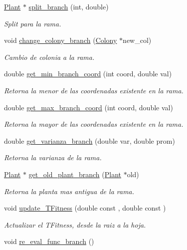 \begin{DoxyCompactItemize}
\item 
\hyperlink{class_plant}{Plant} $\ast$ \hyperlink{class_plant_ab7c3c50790efd2843219e439cdf7e687}{split\+\_\+branch} (int, double)
\begin{DoxyCompactList}\small\item\em Split para la rama. \end{DoxyCompactList}\item 
void \hyperlink{class_plant_a3da8873875164b9924111020fb3a374e}{change\+\_\+colony\+\_\+branch} (\hyperlink{class_colony}{Colony} $\ast$new\+\_\+col)
\begin{DoxyCompactList}\small\item\em Cambio de colonia a la rama. \end{DoxyCompactList}\item 
double \hyperlink{class_plant_a19634cf97e315f3245130ef23ce1a670}{get\+\_\+min\+\_\+branch\+\_\+coord} (int coord, double val)
\begin{DoxyCompactList}\small\item\em Retorna la menor de las coordenadas existente en la rama. \end{DoxyCompactList}\item 
double \hyperlink{class_plant_ab827c5ca9da0923a949232e0c81bb0fe}{get\+\_\+max\+\_\+branch\+\_\+coord} (int coord, double val)
\begin{DoxyCompactList}\small\item\em Retorna la mayor de las coordenadas existente en la rama. \end{DoxyCompactList}\item 
double \hyperlink{class_plant_a46456807d2ad5b9f141af448f216b5d7}{get\+\_\+varianza\+\_\+branch} (double var, double prom)
\begin{DoxyCompactList}\small\item\em Retorna la varianza de la rama. \end{DoxyCompactList}\item 
\hyperlink{class_plant}{Plant} $\ast$ \hyperlink{class_plant_a3540c994a995d890f1d41f1646e5bfa8}{get\+\_\+old\+\_\+plant\+\_\+branch} (\hyperlink{class_plant}{Plant} $\ast$old)
\begin{DoxyCompactList}\small\item\em Retorna la planta mas antigua de la rama. \end{DoxyCompactList}\item 
void \hyperlink{class_plant_a71a465c3487f93129829b87550e83fcf}{update\+\_\+\+T\+Fitness} (double const , double const )
\begin{DoxyCompactList}\small\item\em Actualizar el T\+Fitness, desde la raiz a la hoja. \end{DoxyCompactList}\item 
\hypertarget{class_plant_a334ffc92dcb5081cf17db59c3acb58d0}{void \hyperlink{class_plant_a334ffc92dcb5081cf17db59c3acb58d0}{re\+\_\+eval\+\_\+func\+\_\+branch} ()}\label{class_plant_a334ffc92dcb5081cf17db59c3acb58d0}


\end{DoxyCompactItemize}
